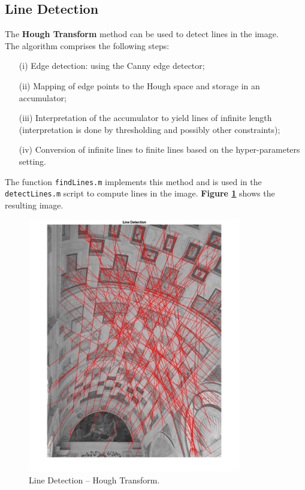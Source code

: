 \documentclass[12pt,a4paper]{article}
\begin{document}
\subsection{Line Detection}
\label{sec:lineDetection}
The \textbf{Hough Transform} method can be used to detect lines in the image.\\

The algorithm comprises the following steps:
\begin{itemize}
    \item[(i)] Edge detection: using the Canny edge detector;
    \item[(ii)] Mapping of edge points to the Hough space and storage in an accumulator;
    \item[(iii)] Interpretation of the accumulator to yield lines of infinite length (interpretation is done by thresholding and possibly other constraints);
    \item[(iv)] Conversion of infinite lines to finite lines based on the hyper-parameters setting.
\end{itemize}
\bigskip
The function \verb|findLines.m| implements this method and is used in the \verb|detectLines.m| script to compute lines in the image. \textbf{Figure \ref{fig:lines}} shows the resulting image.

\begin{figure}[H]
    \centering
    \includegraphics[width=0.83\textwidth]{Images/PalazzoTe_lines.png}
    \caption[Line Detection -- Hough Transform.]{Line Detection -- Hough Transform.}
    \label{fig:lines}
\end{figure}
\end{document}
